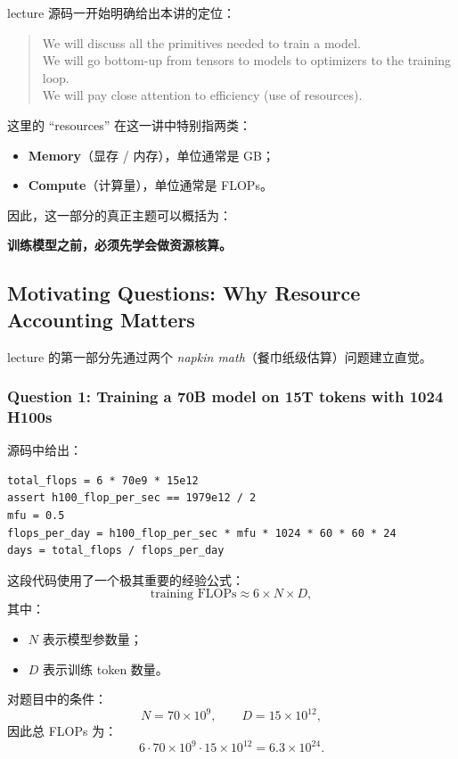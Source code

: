 \documentclass[a4paper,UTF8]{article}
\numberwithin{equation}{section}
\begin{document}
lecture 源码一开始明确给出本讲的定位：
\begin{quote}
We will discuss all the primitives needed to train a model. \\
We will go bottom-up from tensors to models to optimizers to the training loop. \\
We will pay close attention to efficiency (use of resources).
\end{quote}

这里的 ``resources'' 在这一讲中特别指两类：
\begin{itemize}
    \item \textbf{Memory}（显存 / 内存），单位通常是 GB；
    \item \textbf{Compute}（计算量），单位通常是 FLOPs。
\end{itemize}

因此，这一部分的真正主题可以概括为：
\begin{center}
\textbf{训练模型之前，必须先学会做资源核算。}
\end{center}

\subsection{Motivating Questions: Why Resource Accounting Matters}

lecture 的第一部分先通过两个 \emph{napkin math}（餐巾纸级估算）问题建立直觉。

\subsubsection{Question 1: Training a 70B model on 15T tokens with 1024 H100s}

源码中给出：
\begin{verbatim}
total_flops = 6 * 70e9 * 15e12
assert h100_flop_per_sec == 1979e12 / 2
mfu = 0.5
flops_per_day = h100_flop_per_sec * mfu * 1024 * 60 * 60 * 24
days = total_flops / flops_per_day
\end{verbatim}

这段代码使用了一个极其重要的经验公式：
\[
\text{training FLOPs} \approx 6 \times N \times D,
\]
其中：
\begin{itemize}
    \item \(N\) 表示模型参数量；
    \item \(D\) 表示训练 token 数量。
\end{itemize}

对题目中的条件：
\[
N = 70 \times 10^9, \qquad D = 15 \times 10^{12},
\]
因此总 FLOPs 为：
\[
6 \cdot 70 \times 10^9 \cdot 15 \times 10^{12}
= 6.3 \times 10^{24}.
\]
\end{document}
